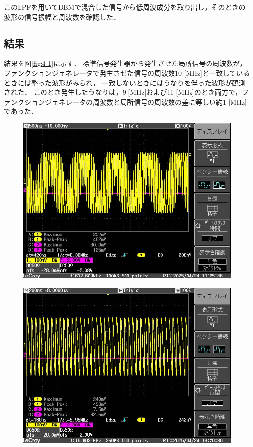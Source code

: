 \documentclass[uplatex,dvipdfmx,a4j,12pt]{jsarticle}
\begin{document}
このLPFを用いてDBMで混合した信号から低周波成分を取り出し，そのときの波形の信号振幅と周波数を確認した．

\subsection{結果}
結果を図\ref{fig:4-1}に示す．
標準信号発生器から発生させた局所信号の周波数が，ファンクションジェネレータで発生させた信号の周波数10 [MHz]と一致しているときには整った波形がみられ，
一致しないときにはうなりを伴った波形が観測された．
このとき発生したうなりは，9 [MHz]および11 [MHz]のとき両方で，ファンクションジェネレータの周波数と局所信号の周波数の差に等しい約1 [MHz]であった．
\begin{figure}[H]
    \centering
    \begin{minipage}
        [b]{0.45\linewidth}
        \centering
        \includegraphics[width=\linewidth]{img/4_1_8MHz.jpg}
        \label{fig:4-1-a}
    \end{minipage}
    \begin{minipage}
        [b]{0.45\linewidth}
        \centering
        \includegraphics[width=\linewidth]{img/4_1_10MHz.jpg}

\end{minipage}
\end{figure}
\end{document}

